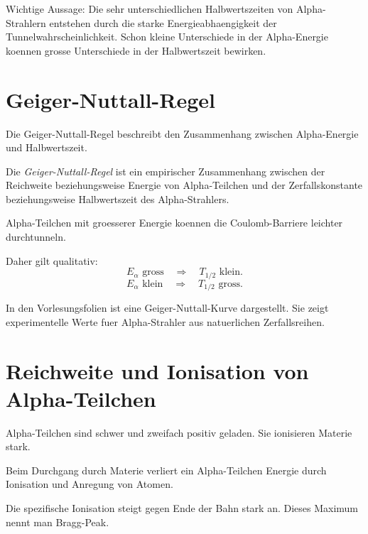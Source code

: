 \begin{examtipbox}
Wichtige Aussage:
Die sehr unterschiedlichen Halbwertszeiten von Alpha-Strahlern entstehen durch die
starke Energieabhaengigkeit der Tunnelwahrscheinlichkeit.
Schon kleine Unterschiede in der Alpha-Energie koennen grosse Unterschiede in der
Halbwertszeit bewirken.
\end{examtipbox}

\section{Geiger-Nuttall-Regel}

Die Geiger-Nuttall-Regel beschreibt den Zusammenhang zwischen Alpha-Energie und
Halbwertszeit.

\begin{definitionbox}
Die \emph{Geiger-Nuttall-Regel} ist ein empirischer Zusammenhang zwischen der
Reichweite beziehungsweise Energie von Alpha-Teilchen und der Zerfallskonstante
beziehungsweise Halbwertszeit des Alpha-Strahlers.
\end{definitionbox}

\begin{conceptbox}
Alpha-Teilchen mit groesserer Energie koennen die Coulomb-Barriere leichter
durchtunneln.

Daher gilt qualitativ:
\[
    E_\alpha \text{ gross}
    \quad\Rightarrow\quad
    T_{1/2} \text{ klein}.
\]
\[
    E_\alpha \text{ klein}
    \quad\Rightarrow\quad
    T_{1/2} \text{ gross}.
\]
\end{conceptbox}

\begin{notebox}
In den Vorlesungsfolien ist eine Geiger-Nuttall-Kurve dargestellt.
Sie zeigt experimentelle Werte fuer Alpha-Strahler aus natuerlichen Zerfallsreihen.
\end{notebox}

\section{Reichweite und Ionisation von Alpha-Teilchen}

Alpha-Teilchen sind schwer und zweifach positiv geladen.
Sie ionisieren Materie stark.

\begin{conceptbox}
Beim Durchgang durch Materie verliert ein Alpha-Teilchen Energie durch Ionisation
und Anregung von Atomen.

Die spezifische Ionisation steigt gegen Ende der Bahn stark an.
Dieses Maximum nennt man Bragg-Peak.
\end{conceptbox}

